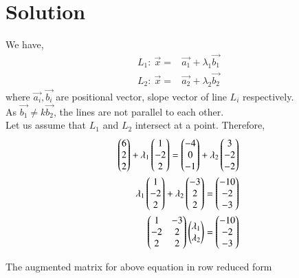 \documentclass[journal,12pt,twocolumn]{IEEEtran}
\begin{document}
\section{Solution}
We have,
\begin{align}
    \label{eq:3}                       
    L_{1}: \: \Vec{x}={}&\Vec{a_{1}}+\lambda_{1}\Vec{b_{1}}\\
    \label{eq:4}
    L_{2}: \: \Vec{x}={}&\Vec{a_{2}}+\lambda_{2}\Vec{b_{2}}
\end{align}
where $\Vec{a_{i}},\Vec{b_{i}}$ are positional vector, slope vector of line $L_{i}$ respectively.\\
As $\Vec{b_{1}}\neq k \Vec{b_{2}}$, the lines are not parallel to each other.
\\ Let us assume that $L_{1}$ and $L_{2}$ intersect at a point. Therefore,
\begin{align}
    \label{eq:5}
    \begin{pmatrix}6 \\ 2\\ 2 \end{pmatrix} +\lambda_{1}\begin{pmatrix}1 \\ -2 \\ 2\end{pmatrix} = \begin{pmatrix}-4 \\ 0\\ -1\end{pmatrix} + \lambda_{2}\begin{pmatrix}3 \\ -2 \\ -2\end{pmatrix} \\
    \label{eq:6}
    \lambda_{1}\begin{pmatrix}1 \\ -2 \\ 2\end{pmatrix} + \lambda_{2}\begin{pmatrix}-3 \\ 2 \\ 2\end{pmatrix}= \begin{pmatrix}-10 \\ -2\\ -3 \end{pmatrix} \\
    \label{eq:7}
    \begin{pmatrix}1 & -3\\ -2 &2 \\ 2 & 2\end{pmatrix}\begin{pmatrix}\lambda_{1}\\ \lambda_{2}\end{pmatrix}=
    \begin{pmatrix}-10 \\ -2\\ -3 \end{pmatrix}
\end{align}

The augmented matrix for above equation in row reduced form

      \\  
    
\end{document}
